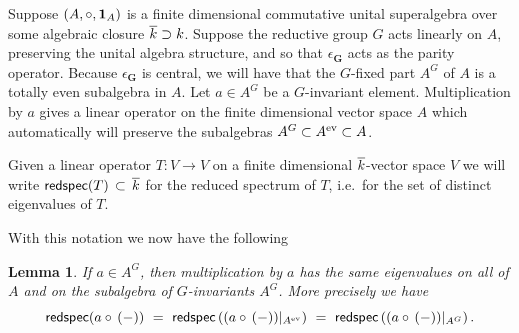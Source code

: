 \documentclass[twoside,leqno]{article}
\numberwithin{equation}{section}
\theoremstyle{plain}
\newtheorem{lemma}[equation]{Lemma}
\theoremstyle{definition}
\begin{document}
Suppose $(A,\circ,\mathbf{1}_{A})$ is a finite dimensional commutative unital superalgebra over some algebraic closure $\overline{k} \supset k$. Suppose the reductive group $G$ acts linearly on $A$, preserving the unital algebra structure, and so that $\epsilon_{\mathbf{G}}$ acts as the parity operator. Because $\epsilon_{\mathbf{G}}$  is central, we will have that 
the $G$-fixed part $A^{G}$ of $A$ is a totally even subalgebra in $A$. Let $a \in A^{G}$ be a $G$-invariant element. Multiplication by $a$ gives a linear operator on the finite dimensional vector space $A$ which automatically will preserve the subalgebras $A^{G} \subset A^{\mathrm{ev}} \subset A$. 

Given a linear operator $T \colon V \to V$ on a finite dimensional $\overline{k}$-vector space $V$ we will 
write $\mathsf{redspec}(T) \, \subset \, \overline{k}$ for the reduced spectrum of $T$,  i.e.\ for the set of distinct eigenvalues of $T$. 

With this notation we now have the following

\begin{lemma} \label{lem:Ginvariants}  If $a \in A^{G}$, then multiplication by $a$ has the same eigenvalues on all of $A$ and on the 
subalgebra of $G$-invariants $A^{G}$. More precisely we have
\[
\mathsf{redspec}(a\fp\, (-)) \ = \ \mathsf{redspec}\left( (a\fp\, (-))|_{A^{\even}}\right) \ = \ \mathsf{redspec}\left( (a\fp\, (-))|_{A^{G}}\right).
\]
\end{lemma}
\end{document}
